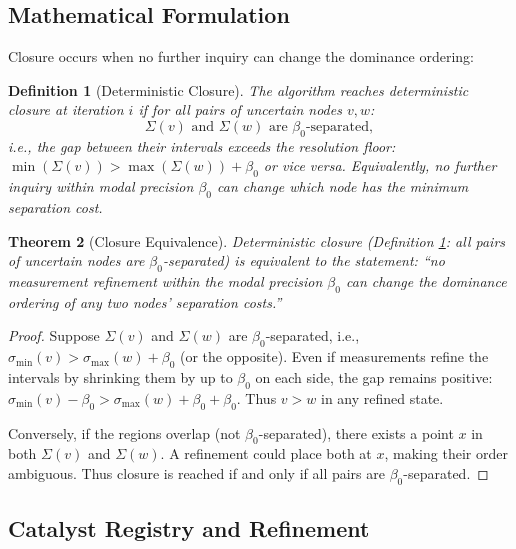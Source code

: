 \documentclass[twocolumn,11pt,a4paper]{article}
\newtheorem{theorem}{Theorem}[section]
\newtheorem{definition}[theorem]{Definition}
\theoremstyle{definition}
\begin{document}
\subsection{Mathematical Formulation}

Closure occurs when no further inquiry can change the dominance ordering:

\begin{definition}[Deterministic Closure]
\label{def:closure}
The algorithm reaches \emph{deterministic closure} at iteration $i$ if for all pairs of uncertain nodes $v, w$:
\begin{equation}
\Sigma(v) \text{ and } \Sigma(w) \text{ are } \beta_0\text{-separated},
\end{equation}
i.e., the gap between their intervals exceeds the resolution floor: $\min(\Sigma(v)) > \max(\Sigma(w)) + \beta_0$ or vice versa. Equivalently, no further inquiry within modal precision $\beta_0$ can change which node has the minimum separation cost.
\end{definition}

\begin{theorem}[Closure Equivalence]
\label{thm:closure_equivalence}
Deterministic closure (Definition \ref{def:closure}: all pairs of uncertain nodes are $\beta_0$-separated) is equivalent to the statement: ``no measurement refinement within the modal precision $\beta_0$ can change the dominance ordering of any two nodes' separation costs.''
\end{theorem}

\begin{proof}
Suppose $\Sigma(v)$ and $\Sigma(w)$ are $\beta_0$-separated, i.e., $\sigma_{\min}(v) > \sigma_{\max}(w) + \beta_0$ (or the opposite). Even if measurements refine the intervals by shrinking them by up to $\beta_0$ on each side, the gap remains positive: $\sigma_{\min}(v) - \beta_0 > \sigma_{\max}(w) + \beta_0 + \beta_0$. Thus $v > w$ in any refined state.

Conversely, if the regions overlap (not $\beta_0$-separated), there exists a point $x$ in both $\Sigma(v)$ and $\Sigma(w)$. A refinement could place both at $x$, making their order ambiguous. Thus closure is reached if and only if all pairs are $\beta_0$-separated.
\end{proof}

\subsection{Catalyst Registry and Refinement}
\end{document}
